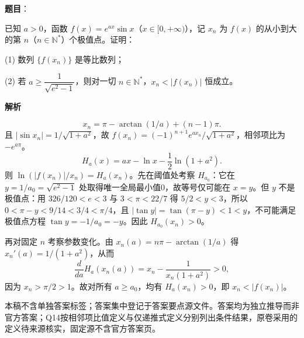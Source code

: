 \begin{answer}

\textbf{题目}：

已知 \(a>0\)，函数 \(f(x)=e^{ax}\sin x\)（\(x\in[0,+\infty)\)），记 \(x_n\) 为 \(f(x)\) 的从小到大的第 \(n\)（\(n\in\mathbb N^*\)）个极值点。证明：

(1) 数列 \(\{f(x_n)\}\) 是等比数列；

(2) 若 \(a\geqslant\dfrac{1}{\sqrt{e^2-1}}\)，则对一切 \(n\in\mathbb N^*\)，\(x_n<\lvert f(x_n)\rvert\) 恒成立。

\textbf{解析}

\nopagebreak[4]
\[
x_n=\pi-\arctan(1/a)+(n-1)\pi.
\]
且 \(|\sin x_n|=1/\sqrt{1+a^2}\)，故 \(f(x_n)=(-1)^{n+1}e^{ax_n}/\sqrt{1+a^2}\)，相邻项比为 \(-e^{a\pi}\)。
\nopagebreak[4]
\[
H_a(x)=ax-\ln x-\frac12\ln(1+a^2).
\]
则 \(\ln(|f(x_n)|/x_n)=H_a(x_n)\)。先在阈值处考察 \(H_{a_0}\)：它在 \(y=1/a_0=\sqrt{e^2-1}\) 处取得唯一全局最小值0，故等号仅可能在 \(x=y\)。但 \(y\) 不是极值点：用 \(326/120<e<3\) 与 \(3<\pi<22/7\) 得 \(5/2<y<3\)，所以 \(0<\pi-y<9/14<3/4<\pi/4\)，且 \(|\tan y|=\tan(\pi-y)<1<y\)，不可能满足极值点方程 \(\tan y=-1/a_0=-y\)。因此 \(H_{a_0}(x_n)>0\)。

再对固定 \(n\) 考察参数变化。由 \(x_n(a)=n\pi-\arctan(1/a)\) 得 \(x_n'(a)=1/(1+a^2)\)，从而
\nopagebreak[4]
\[
\frac{d}{da}H_a(x_n(a))=x_n-\frac1{x_n(1+a^2)}>0,
\]
因为 \(x_n>\pi/2>1\)。故对所有 \(a\ge a_0\)，均有 \(H_a(x_n)>0\)，即 \(x_n<|f(x_n)|\)。

本稿不含单独答案标签；答案集中登记于答案要点源文件。答案均为独立推导而非官方答案；Q14按相邻项比值定义与仅递推式定义分别列出条件结果，原卷采用的定义待来源核实，固定源不含官方答案页。



\end{answer}